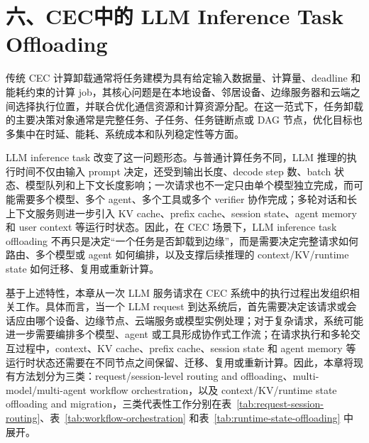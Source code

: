 \section*{六、CEC中的 LLM Inference Task Offloading}

传统 CEC 计算卸载通常将任务建模为具有给定输入数据量、计算量、deadline 和能耗约束的计算 job，其核心问题是在本地设备、邻居设备、边缘服务器和云端之间选择执行位置，并联合优化通信资源和计算资源分配。在这一范式下，任务卸载的主要决策对象通常是完整任务、子任务、任务链断点或 DAG 节点，优化目标也多集中在时延、能耗、系统成本和队列稳定性等方面。


LLM inference task 改变了这一问题形态。与普通计算任务不同，LLM 推理的执行时间不仅由输入 prompt 决定，还受到输出长度、decode step 数、batch 状态、模型队列和上下文长度影响；一次请求也不一定只由单个模型独立完成，而可能需要多个模型、多个 agent、多个工具或多个 verifier 协作完成；多轮对话和长上下文服务则进一步引入 KV cache、prefix cache、session state、agent memory 和 user context 等运行时状态。因此，在 CEC 场景下，LLM inference task offloading 不再只是决定“一个任务是否卸载到边缘”，而是需要决定完整请求如何路由、多个模型或 agent 如何编排，以及支撑后续推理的 context/KV/runtime state 如何迁移、复用或重新计算。


基于上述特性，本章从一次 LLM 服务请求在 CEC 系统中的执行过程出发组织相关工作。具体而言，当一个 LLM request 到达系统后，首先需要决定该请求或会话应由哪个设备、边缘节点、云端服务或模型实例处理；对于复杂请求，系统可能进一步需要编排多个模型、agent 或工具形成协作式工作流；在请求执行和多轮交互过程中，context、KV cache、prefix cache、session state 和 agent memory 等运行时状态还需要在不同节点之间保留、迁移、复用或重新计算。因此，本章将现有方法划分为三类：request/session-level routing and offloading、multi-model/multi-agent workflow orchestration，以及 context/KV/runtime state offloading and migration，三类代表性工作分别在表~\ref{tab:request-session-routing}、表~\ref{tab:workflow-orchestration} 和表~\ref{tab:runtime-state-offloading} 中展开。

